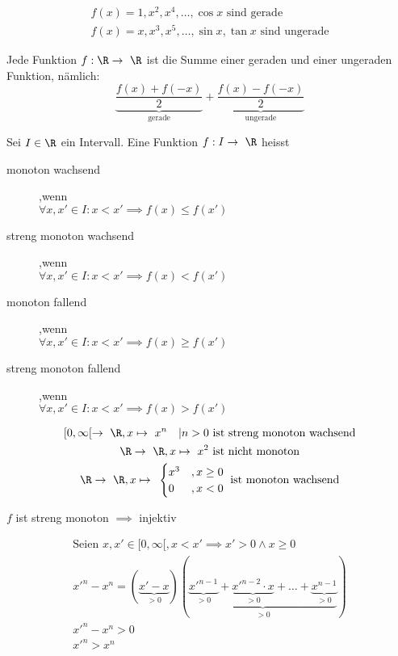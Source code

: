 \begin{bsp*}
	\begin{gather*}
		f(x) = 1 , x^2 , x^4 , \dotsc , \cos x \text{ sind gerade} \\
		f(x) = x , x^3 , x^5 , \dotsc , \sin x , \tan x \text{ sind ungerade}
	\end{gather*}
\end{bsp*}
\begin{bem}
	Jede Funktion $f: \R \rightarrow \R$ ist die Summe einer geraden und einer ungeraden Funktion, nämlich:\\
	\[ \underbrace{\frac{f(x) + f(-x)}{2}}_{\text{gerade}} + \underbrace{\frac{f(x) - f(-x)}{2}}_{\text{ungerade}} \]
\end{bem}
\begin{def*}[note = monoton , index = monoton]
	Sei $I \in \R$ ein Intervall.
	Eine Funktion $f: I \rightarrow \R$ heisst
	\begin{description}
		\item[monoton wachsend] ,wenn \\
			$\forall x , x' \in I : x < x' \implies f(x) \leq f(x')$
		\item[streng monoton wachsend] ,wenn \\
			$\forall x , x' \in I : x < x' \implies f(x) < f(x')$
		\item[monoton fallend] ,wenn \\
			$\forall x , x' \in I : x < x' \implies f(x) \geq f(x')$
		\item[streng monoton fallend] ,wenn \\
			$\forall x , x' \in I : x < x' \implies f(x) > f(x')$
	\end{description}
\end{def*}
\begin{bsp*}
	\begin{gather*}
		[0,\infty[ \rightarrow \R , x \mapsto x^n \quad | n > 0 \text{ ist streng monoton wachsend}\\
		\R \rightarrow \R , x \mapsto x^2 \text{ ist nicht monoton}\\
		\R \rightarrow \R , x \mapsto \begin{cases}
			x^3	&, x \geq 0	\\
			0	&, x < 0	
		\end{cases} \text{ ist monoton wachsend}
	\end{gather*}
\end{bsp*}
\begin{bem}
	$f$ ist streng monoton $\implies$ injektiv
\end{bem}
\begin{bsp*}
	\begin{gather*}
		\text{Seien } x, x' \in [0,\infty[ , x < x' \implies x' > 0 \wedge x \geq 0 \\
		x'^n - x^n = ( \underbrace{x' - x}_{>0} )( \underbrace{\underbrace{x'^{n-1}}_{>0} + \underbrace{x'^{n-2} \cdot x}_{>0} + \dots + \underbrace{x^{n-1}}_{>0}}_{>0} ) \\
		x'^n - x^n > 0 \\
		x'^n > x^n
	\end{gather*}
\end{bsp*}

